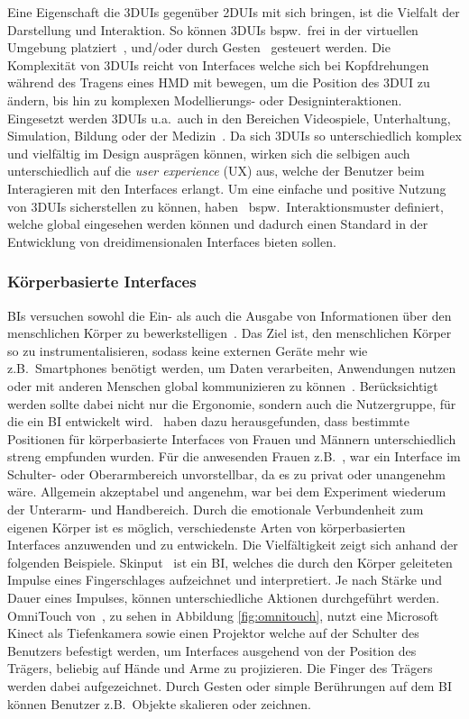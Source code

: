 \noindent Eine Eigenschaft die 3DUIs gegenüber 2DUIs mit sich bringen, ist die Vielfalt der Darstellung und Interaktion. So können 3DUIs bspw.~frei in der virtuellen Umgebung platziert~\cite{anintroductionto3dspacial}, und/oder durch Gesten~\cite{introduction3dgesturalinterfaces} gesteuert werden. Die Komplexität von 3DUIs reicht von Interfaces welche sich bei Kopfdrehungen während des Tragens eines HMD mit bewegen, um die Position des 3DUI zu ändern, bis hin zu komplexen Modellierungs- oder Designinteraktionen. Eingesetzt werden 3DUIs u.a.~auch in den Bereichen Videospiele, Unterhaltung, Simulation, Bildung oder der Medizin~\cite{theoryandpracticebook}. Da sich 3DUIs so unterschiedlich komplex und vielfältig im Design ausprägen können, wirken sich die selbigen auch unterschiedlich auf die \textit{user experience} (UX) aus, welche der Benutzer beim Interagieren mit den Interfaces erlangt. Um eine einfache und positive Nutzung von 3DUIs sicherstellen zu können, haben~\cite{interactionpatterns} bspw.~Interaktionsmuster definiert, welche global eingesehen werden können und dadurch einen Standard in der Entwicklung von dreidimensionalen Interfaces bieten sollen.

\subsubsection{Körperbasierte Interfaces}
BIs versuchen sowohl die Ein- als auch die Ausgabe von Informationen über den menschlichen Körper zu bewerkstelligen~\cite{implicationsoflocation}. Das Ziel ist, den menschlichen Körper so zu instrumentalisieren, sodass keine externen Geräte mehr wie z.B.~Smartphones benötigt werden, um Daten verarbeiten, Anwendungen nutzen oder mit anderen Menschen global kommunizieren zu können~\cite{skinput}. Berücksichtigt werden sollte dabei nicht nur die Ergonomie, sondern auch die Nutzergruppe, für die ein BI entwickelt wird.~\cite{implicationsoflocation} haben dazu herausgefunden, dass bestimmte Positionen für körperbasierte Interfaces von Frauen und Männern unterschiedlich streng empfunden wurden. Für die anwesenden Frauen z.B.~, war ein Interface im Schulter- oder Oberarmbereich unvorstellbar, da es zu privat oder unangenehm wäre. Allgemein akzeptabel und angenehm, war bei dem Experiment wiederum der Unterarm- und Handbereich. Durch die emotionale Verbundenheit zum eigenen Körper ist es möglich, verschiedenste Arten von körperbasierten Interfaces anzuwenden und zu entwickeln. Die Vielfältigkeit zeigt sich anhand der folgenden Beispiele. Skinput~\cite{skinput} ist ein BI, welches die durch den Körper geleiteten Impulse eines Fingerschlages aufzeichnet und interpretiert. Je nach Stärke und Dauer eines Impulses, können unterschiedliche Aktionen durchgeführt werden. OmniTouch von~\cite{omnitouch}, zu sehen in Abbildung \ref{fig:omnitouch}, nutzt eine Microsoft Kinect als Tiefenkamera sowie einen Projektor welche auf der Schulter des Benutzers befestigt werden, um Interfaces ausgehend von der Position des Trägers, beliebig auf Hände und Arme zu projizieren. Die Finger des Trägers werden dabei aufgezeichnet. Durch Gesten oder simple Berührungen auf dem BI können Benutzer z.B.~Objekte skalieren oder zeichnen.\\

